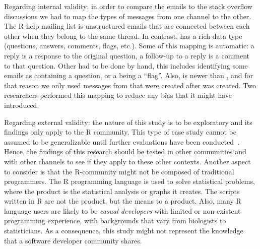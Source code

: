 Regarding internal validity: in order to compare the emails to the stack overflow discussions we had to map the types of messages from one channel to the
other. The R-help mailing list is unstructured emails that are connected between each other when they belong to the same thread. In contrast, \SO has a rich
data type (questions, answers, comments, flags, etc.). Some of this mapping is automatic: a reply is a response to the original question, a follow-up to a reply
is a comment to that question. Other had to be done by hand, this includes identifying some emails as containing a question, or a being a ``flag''.
Also, \SO is newer than \RH, and for that reason we only used messages from \RH that were created after \SO was created.
Two researchers performed this mapping to reduce any bias that it might have  introduced.


Regarding external validity: the nature of this study is to be exploratory and its findings only apply to the R community.
This type of case study cannot be assumed to be generalizable until further evaluations have been conducted~\cite{Yin2009}.
    Hence, the findings of this research should be tested in other communities and with other channels to see if they apply to these other contexts.
Another aspect to consider is that the R-community might not be composed of traditional programmers.
    The R programming language is used to solve statistical problems, where the product is the statistical analysis or graphs it creates. The scripts written in
    R are not the product, but the means to a product.
    Also, many R language users are likely to be \textit{casual developers} with limited or non-existent programming experience, with backgrounds that vary from
    biologists to statisticians. As a consequence, this study might not represent the knowledge that a software developer community shares. 

